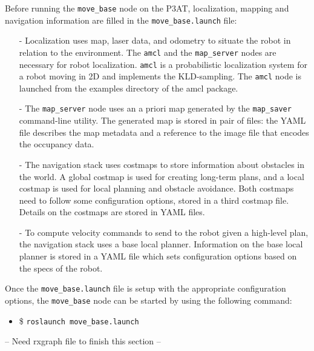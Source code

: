 Before running the \texttt{move\_base} node on the P3AT, localization, mapping and navigation information are filled in the \texttt{move\_base.launch} file:
\begin{itemize}
 \item [-] Localization uses map, laser data, and odometry to situate the robot in relation to the environment. The \texttt{amcl} and the \texttt{map\_server} nodes are necessary for robot localization. \texttt{amcl} is a probabilistic localization system for a robot moving in 2D and implements the KLD-sampling\cite{DIETER.IJRS.2003}.
The \texttt{amcl} node is launched from the examples directory of the amcl package.
\item [-] The \texttt{map\_server} node uses an a priori map generated by the \texttt{map\_saver} command-line utility. The generated map is stored in pair of files: the YAML file describes the map metadata and a reference to the image file that encodes the occupancy data.
\item [-] The navigation stack uses costmaps to store information about obstacles in the world. A global costmap is used for creating long-term plans, and a local costmap is used for local planning and obstacle avoidance. Both costmaps need to follow some configuration options, stored in a third costmap file. Details on the costmaps are stored in YAML files.
\item [-] To compute velocity commands to send to the robot given a high-level plan, the navigation stack uses a base local planner. Information on the base local planner is stored in a YAML file which sets configuration options based on the specs of the robot.
\end{itemize}

Once the \texttt{move\_base.launch} file is setup with the appropriate configuration options, the \texttt{move\_base} node can be started by using the following command:
\begin{itemize}
 \item [] \item \$ \texttt{roslaunch move\_base.launch}
\end{itemize}

-- Need rxgraph file to finish this section -- 